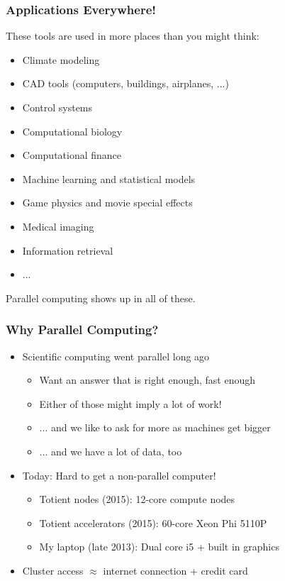 \documentclass{beamer}
\begin{document}
\begin{frame}
  \frametitle{Applications Everywhere!}

  These tools are used in more places than you might think:
  \begin{itemize}
  \item Climate modeling
  \item CAD tools (computers, buildings, airplanes, ...)
  \item Control systems
  \item Computational biology
  \item Computational finance
  \item Machine learning and statistical models
  \item Game physics and movie special effects
  \item Medical imaging
  \item Information retrieval
  \item ...
  \end{itemize}
  Parallel computing shows up in all of these.

\end{frame}


\begin{frame}
  \frametitle{Why Parallel Computing?}

  \begin{itemize}
  \item Scientific computing went parallel long ago
    \begin{itemize}
    \item Want an answer that is right enough, fast enough
    \item Either of those might imply a lot of work!
    \item ... and we like to ask for more as machines get bigger
    \item ... and we have a lot of data, too
    \end{itemize}
  \item Today: Hard to get a non-parallel computer!
    \begin{itemize}
    \item Totient nodes (2015): 12-core compute nodes
    \item Totient accelerators (2015): 60-core Xeon Phi 5110P
    \item My laptop (late 2013): Dual core i5 + built in graphics
    \end{itemize}
  \item Cluster access $\approx$ internet connection + credit card
  \end{itemize}
\end{frame}
\end{document}
